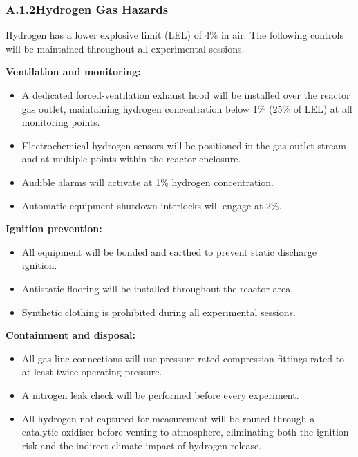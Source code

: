 \documentclass[12pt]{article}
\begin{document}
\subsubsection*{A.1.2\quad Hydrogen Gas Hazards}

Hydrogen has a lower explosive limit (LEL) of 4\% in air. The following controls
will be maintained throughout all experimental sessions.

\medskip
\noindent\textbf{Ventilation and monitoring:}
\begin{itemize}[itemsep=3pt]
    \item A dedicated forced-ventilation exhaust hood will be installed over the
          reactor gas outlet, maintaining hydrogen concentration below 1\%
          (25\% of LEL) at all monitoring points.
    \item Electrochemical hydrogen sensors will be positioned in the gas outlet
          stream and at multiple points within the reactor enclosure.
    \item Audible alarms will activate at 1\% hydrogen concentration.
    \item Automatic equipment shutdown interlocks will engage at 2\%.
\end{itemize}

\medskip
\noindent\textbf{Ignition prevention:}
\begin{itemize}[itemsep=3pt]
    \item All equipment will be bonded and earthed to prevent static discharge
          ignition.
    \item Antistatic flooring will be installed throughout the reactor area.
    \item Synthetic clothing is prohibited during all experimental sessions.
\end{itemize}

\medskip
\noindent\textbf{Containment and disposal:}
\begin{itemize}[itemsep=3pt]
    \item All gas line connections will use pressure-rated compression fittings
          rated to at least twice operating pressure.
    \item A nitrogen leak check will be performed before every experiment.
    \item All hydrogen not captured for measurement will be routed through a
          catalytic oxidiser before venting to atmosphere, eliminating both the
          ignition risk and the indirect climate impact of hydrogen release.
\end{itemize}
\end{document}
